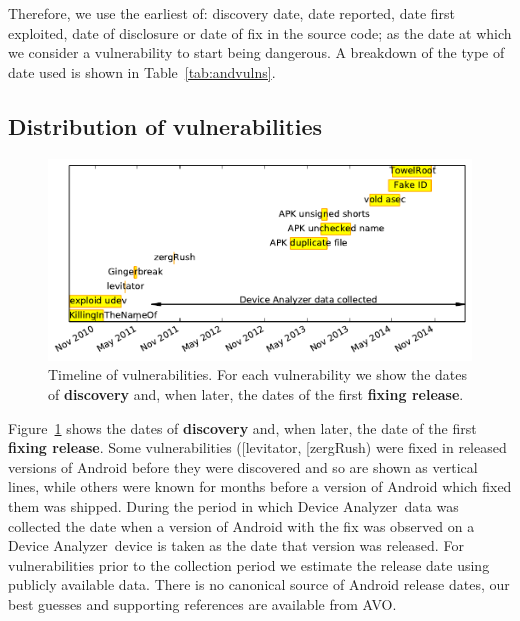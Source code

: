 \documentclass{llncs}
\makeatletter
\newcommand{\da}{Device Analyzer}
\newcommand{\avo}{AVO}
\def\avovuln{\@ifnextchar[{\@avovulnsspecific}{\@avovulngeneral}}
\def\@avovulnsspecific[#1]#2{\emph{\href{http://androidvulnerabilities.org/vulnerabilities/#1}{#2}}}
\def\@avovulngeneral#1{\emph{\href{http://androidvulnerabilities.org/vulnerabilities/#1}{#1}}}
\makeatother
\begin{document}
Therefore, we use the earliest of: discovery date, date reported, date first exploited, date of disclosure or date of fix in the source code; as the date at which we consider a vulnerability to start being dangerous.
A breakdown of the type of date used is shown in Table~\ref{tab:andvulns}.


\subsection{Distribution of vulnerabilities}
\begin{figure}
 \centering
 \includegraphics[width=\columnwidth]{figures/vulnerabilities_timeline}
 \caption{Timeline of vulnerabilities. For each vulnerability we show the dates of \textbf{discovery} and, when later, the dates of the first \textbf{fixing release}.}
 \label{fig:vulnerabilities_timeline}
\end{figure}

Figure~\ref{fig:vulnerabilities_timeline} shows the dates of \textbf{discovery} and, when later, the date of the first \textbf{fixing release}.
Some vulnerabilities (\avovuln{levitator}, \avovuln{zergRush}) were fixed in released versions of Android before they were discovered and so are shown as vertical lines, while others were known for months before a version of Android which fixed them was shipped.
During the period in which \da\ data was collected the date when a version of Android with the fix was observed on a \da\ device is taken as the date that version was released.
For vulnerabilities prior to the collection period we estimate the release date using publicly available data.
There is no canonical source of Android release dates, our best guesses and supporting references are available from \avo.

\end{document}
